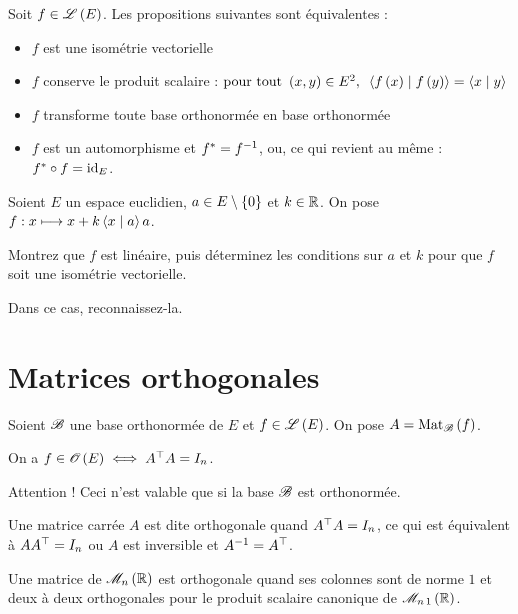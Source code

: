 \begin{prop}
Soit \(f\in\mathscr{L}\left(E\right)\). Les propositions suivantes sont équivalentes :

\begin{itemize}
    \item \(f\) est une isométrie vectorielle \\
    \item \(f\) conserve le produit scalaire : \(\quantifs{\tpt\paren{x,y}\in E^2}\ps{f\paren{x}}{f\paren{y}}=\ps{x}{y}\) \\
    \item \(f\) transforme toute base orthonormée en base orthonormée \\
    \item \(f\) est un automorphisme et \(f^*=f^{-1}\), ou, ce qui revient au même : \(f^*\circ f=\mathrm{id}_{E}\).
\end{itemize}
\end{prop}

\begin{exo}
Soient \(E\) un espace euclidien, \(a\in E\setminus\left\lbrace0\right\rbrace\) et \(k\in\mathbb{R}\). On pose \(f:x\mapsto x+k\ps{x}{a}a\).

Montrez que \(f\) est linéaire, puis déterminez les conditions sur \(a\) et \(k\) pour que \(f\) soit une isométrie vectorielle.

Dans ce cas, reconnaissez-la.
\end{exo}

\section{Matrices orthogonales}

\begin{prop}
Soient \(\mathscr{B}\) une base orthonormée de \(E\) et \(f\in\mathscr{L}\left(E\right)\). On pose \(A=\Mat{f}\).

On a \(f\in\Orth{}[E]\ssi\trans{A}A=I_n\).
\end{prop}

Attention ! Ceci n'est valable que si la base \(\mathscr{B}\) est orthonormée.

\begin{defi}
Une matrice carrée \(A\) est dite orthogonale quand \(A^{\top}A=I_n\), ce qui est équivalent à \(AA^{\top}=I_n\) ou \(A\) est inversible et \(A^{-1}=A^{\top}\).
\end{defi}

\begin{prop}
Une matrice de \(\M{n}[\R]\) est orthogonale quand ses colonnes sont de norme \(1\) et deux à deux orthogonales pour le produit scalaire canonique de \(\M{n\,1}[\R]\).
\end{prop}

